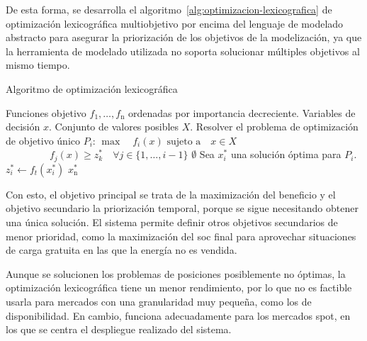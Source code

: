 De esta forma, se desarrolla el algoritmo~\ref{alg:optimizacion-lexicografica} de optimización lexicográfica multiobjetivo por encima del lenguaje de modelado abstracto para asegurar la priorización de los objetivos de la modelización, ya que la herramienta de modelado utilizada no soporta solucionar múltiples objetivos al mismo tiempo.

\begin{algorithm}
  \caption{Algoritmo de optimización lexicográfica}%
  \label{alg:optimizacion-lexicografica}
  \begin{algorithmic}
    \Require{} Funciones objetivo \( f_{1}, \dots, f_{\mathrm{n}} \) ordenadas por importancia decreciente.
    \Require{} Variables de decisión \( x \).
    \Require{} Conjunto de valores posibles \( X \).
    \State{} Resolver el problema de optimización de objetivo único \( P_{i} \):
    \Statex{} \hspace{\algorithmicindent} \( \max \quad f_{i}(x) \)
    \Statex{} \hspace{\algorithmicindent} \( \text{sujeto a} \quad x \in X \)
    \Statex{} \hspace{\algorithmicindent} \( \phantom{\text{sujeto a} \quad} f_{j}(x) \geq z_k^* \quad \forall j \in \{1, \dots, i - 1\} \)
    \State{} \Return{} \( \emptyset \)
    \EndIf{}
    \State{} Sea \( x^{*}_{i} \) una solución óptima para \( P_{i} \).
    \State{} \( z^{*}_{i} \gets f_{t}(x^{*}_{i}) \) 
    \EndFor{}
    \State{} \Return{} \( x^{*}_{\mathrm{n}} \)
  \end{algorithmic}
\end{algorithm}

Con esto, el objetivo principal se trata de la maximización del beneficio y el objetivo secundario la priorización temporal, porque se sigue necesitando obtener una única solución. El sistema permite definir otros objetivos secundarios de menor prioridad, como la maximización del \gls{soc} final para aprovechar situaciones de carga gratuita en las que la energía no es vendida.

Aunque se solucionen los problemas de posiciones posiblemente no óptimas, la optimización lexicográfica tiene un menor rendimiento, por lo que no es factible usarla para mercados con una granularidad muy pequeña, como los de disponibilidad. En cambio, funciona adecuadamente para los mercados spot, en los que se centra el despliegue realizado del sistema.

